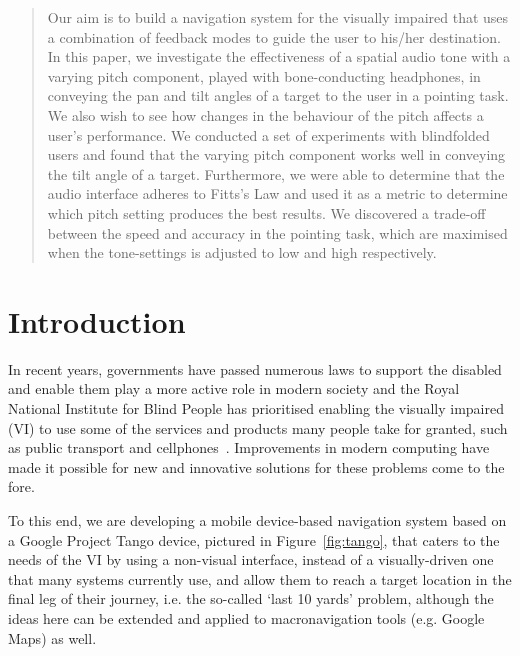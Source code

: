 \documentclass[format=sigconf, review=true, screen=true, anonymous=true]{acmart}
\begin{document}

\begin{abstract}
Our aim is to build a navigation system for the visually impaired that uses a combination of feedback modes to guide the user to his/her destination. In this paper, we investigate the effectiveness of a spatial audio tone with a varying pitch component, played with bone-conducting headphones, in conveying the pan and tilt angles of a target to the user in a pointing task. We also wish to see how changes in the behaviour of the pitch affects a user's performance. We conducted a set of experiments with blindfolded users and found that the varying pitch component works well in conveying the tilt angle of a target. Furthermore, we were able to determine that the audio interface adheres to Fitts's Law and used it as a metric to determine which pitch setting produces the best results. We discovered a trade-off between the speed and accuracy in the pointing task, which are maximised when the tone-settings is adjusted to low and high respectively. 
\end{abstract}

\maketitle

\section{Introduction}

In recent years, governments have passed numerous laws to support the disabled and enable them play a more active role in modern society and the Royal National Institute for Blind People has prioritised enabling the visually impaired (VI) to use some of the services and products many people take for granted, such as public transport and cellphones~\cite{rnib-objectives}. Improvements in modern computing have made it possible for new and innovative solutions for these problems come to the fore.

To this end, we are developing a mobile device-based navigation system based on a Google Project Tango device, pictured in Figure~\ref{fig:tango}, that caters to the needs of the VI by using a non-visual interface, instead of a visually-driven one that many systems currently use, and allow them to reach a target location in the final leg of their journey, i.e. the so-called `last 10 yards' problem, although the ideas here can be extended and applied to macronavigation tools (e.g. Google Maps) as well. 
\end{document}
